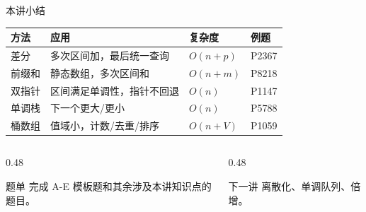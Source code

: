 \documentclass[aspectratio=169]{beamer}
\begin{document}
\begin{frame}{本讲小结}
    \centering
    \footnotesize
    \begin{tabular}{llll}
        \toprule
        方法 & 应用 & 复杂度 & 例题 \\
        \midrule
        差分 & 多次区间加，最后统一查询 & $O(n+p)$ & P2367 \\
        前缀和 & 静态数组，多次区间和 & $O(n+m)$ & P8218 \\
        双指针 & 区间满足单调性，指针不回退 & $O(n)$ & P1147 \\
        单调栈 & 下一个更大/更小 & $O(n)$ & P5788 \\
        桶数组 & 值域小，计数/去重/排序 & $O(n+V)$ & P1059 \\
        \bottomrule
    \end{tabular}
    \vspace{1.2em}
    \begin{columns}[T]
        \begin{column}{0.48\textwidth}
            \begin{block}{题单}
                \footnotesize
                完成 A-E 模板题和其余涉及本讲知识点的题目。
            \end{block}
        \end{column}
        \begin{column}{0.48\textwidth}
            \begin{block}{下一讲}
                \footnotesize
                离散化、单调队列、倍增。
            \end{block}
        \end{column}
    \end{columns}
\end{frame}
\end{document}
